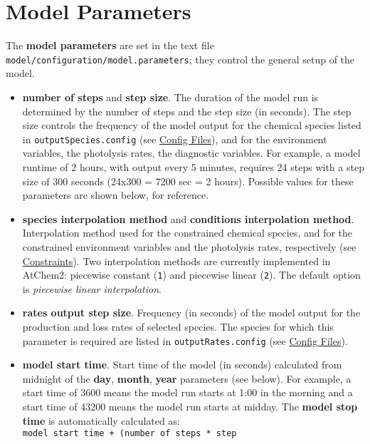 \section{Model Parameters} \label{sec:model-parameters}

The \textbf{model parameters} are set in the text file
\texttt{model/configuration/model.parameters}; they control the
general setup of the model.

\begin{itemize}
\item \textbf{number of steps} and \textbf{step size}. The duration of
  the model run is determined by the number of steps and the step size
  (in seconds). The step size controls the frequency of the model
  output for the chemical species listed in
  \texttt{outputSpecies.config} (see \hyperref[sec:config-files]{Config
    Files}), and for the environment variables, the photolysis rates,
  the diagnostic variables. For example, a model runtime of 2 hours,
  with output every 5 minutes, requires 24 steps with a step size of
  300 seconds (24x300 = 7200 sec = 2 hours). Possible values for these
  parameters are shown below, for reference.
\item \textbf{species interpolation method} and \textbf{conditions
    interpolation method}. Interpolation method used for the
  constrained chemical species, and for the constrained environment
  variables and the photolysis rates, respectively (see
  \hyperref[sec:constraints]{Constraints}). Two interpolation methods
  are currently implemented in AtChem2: piecewise constant
  (\texttt{1}) and piecewise linear (\texttt{2}). The default option
  is \emph{piecewise linear interpolation}.
\item \textbf{rates output step size}. Frequency (in seconds) of the
  model output for the production and loss rates of selected
  species. The species for which this parameter is required are listed
  in \texttt{outputRates.config} (see \hyperref[sec:config-files]{Config
    Files}).
\item \textbf{model start time}. Start time of the model (in seconds)
  calculated from midnight of the \textbf{day}, \textbf{month},
  \textbf{year} parameters (see below). For example, a start time of
  3600 means the model run starts at 1:00 in the morning and a start
  time of 43200 means the model run starts at midday. The
  \textbf{model stop time} is automatically calculated as:
  \texttt{model\ start\ time\ +\ (number\ of\ steps\ *\ step\
}
\end{itemize}
